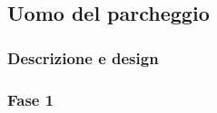 \subsection{Uomo del parcheggio}

    \subsubsection{Descrizione e design}
    
    \subsubsection{Fase 1}

